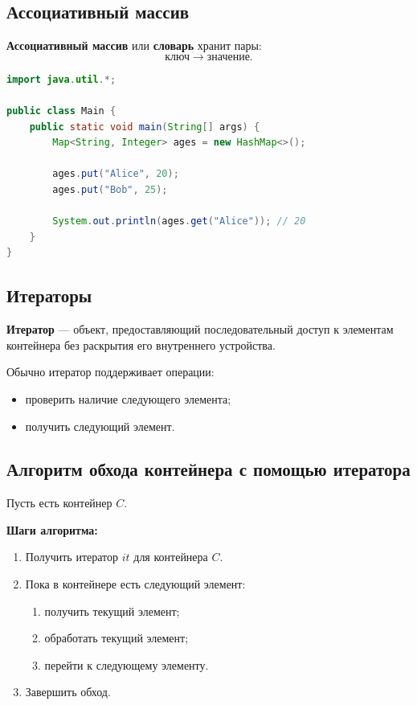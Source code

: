 \documentclass[12pt,a4paper]{article}
\begin{document}
\subsection{Ассоциативный массив}

\textbf{Ассоциативный массив} или \textbf{словарь} хранит пары:
\[
\text{ключ} \rightarrow \text{значение}.
\]

\begin{lstlisting}[language=Java,caption={Ассоциативный массив}]
import java.util.*;

public class Main {
    public static void main(String[] args) {
        Map<String, Integer> ages = new HashMap<>();

        ages.put("Alice", 20);
        ages.put("Bob", 25);

        System.out.println(ages.get("Alice")); // 20
    }
}
\end{lstlisting}

\subsection{Итераторы}

\textbf{Итератор} --- объект, предоставляющий последовательный доступ к элементам контейнера без раскрытия его внутреннего устройства.

Обычно итератор поддерживает операции:
\begin{itemize}
    \item проверить наличие следующего элемента;
    \item получить следующий элемент.
\end{itemize}

\subsection{Алгоритм обхода контейнера с помощью итератора}

Пусть есть контейнер $C$.

\textbf{Шаги алгоритма:}
\begin{enumerate}
    \item Получить итератор $it$ для контейнера $C$.
    \item Пока в контейнере есть следующий элемент:
    \begin{enumerate}
        \item получить текущий элемент;
        \item обработать текущий элемент;
        \item перейти к следующему элементу.
    \end{enumerate}
    \item Завершить обход.
\end{enumerate}
\end{document}
